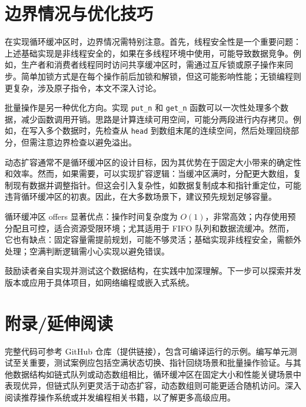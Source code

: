 \chapter{边界情况与优化技巧}
在实现循环缓冲区时，边界情况需特别注意。首先，线程安全性是一个重要问题：上述基础实现是非线程安全的，如果在多线程环境中使用，可能导致数据竞争。例如，生产者和消费者线程同时访问共享缓冲区时，需通过互斥锁或原子操作来同步。简单加锁方式是在每个操作前后加锁和解锁，但这可能影响性能；无锁编程则更复杂，涉及原子指令，本文不深入讨论。\par
批量操作是另一种优化方向。实现 \texttt{put\_{}n} 和 \texttt{get\_{}n} 函数可以一次性处理多个数据，减少函数调用开销。思路是计算连续可用空间，可能分两段进行内存拷贝。例如，在写入多个数据时，先检查从 \texttt{head} 到数组末尾的连续空间，然后处理回绕部分，但需注意边界检查以避免溢出。\par
动态扩容通常不是循环缓冲区的设计目标，因为其优势在于固定大小带来的确定性和效率。然而，如果需要，可以实现扩容逻辑：当缓冲区满时，分配更大数组，复制现有数据并调整指针。但这会引入复杂性，如数据复制成本和指针重定位，可能违背循环缓冲区的初衷。因此，在大多数场景下，建议预先规划足够容量。\par
循环缓冲区 offers 显著优点：操作时间复杂度为 $O(1)$，非常高效；内存使用预分配且可控，适合资源受限环境；尤其适用于 FIFO 队列和数据流缓冲。然而，它也有缺点：固定容量需提前规划，可能不够灵活；基础实现非线程安全，需额外处理；空满判断逻辑需小心实现以避免错误。\par
鼓励读者亲自实现并测试这个数据结构，在实践中加深理解。下一步可以探索并发版本或应用于具体项目，如网络编程或嵌入式系统。\par
\chapter{附录/延伸阅读}
完整代码可参考 GitHub 仓库（提供链接），包含可编译运行的示例。编写单元测试至关重要，测试案例应包括空满状态切换、指针回绕场景和批量操作验证。与其他数据结构如链式队列或动态数组相比，循环缓冲区在固定大小和性能关键场景中表现优异，但链式队列更灵活于动态扩容，动态数组则可能更适合随机访问。深入阅读推荐操作系统或并发编程相关书籍，以了解更多高级应用。\par
